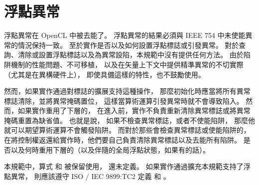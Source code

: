 \section{浮點異常}

浮點異常在 OpenCL 中被去能了。
浮點異常的結果必須與 IEEE 754 中未使能異常的情況保持一致。
至於實作是否以及如何設置浮點標誌或引發異常。
對於查詢、清除或設置浮點標誌以及為異常設陷，本規範中沒有提供任何方法。
由於陷阱機制的性能問題、不可移植，
以及在矢量上下文中提供精準異常的不切實際（尤其是在異構硬件上），
即使具備這樣的特性，也不鼓勵使用。

然而，如果實作通過對標誌的擴展支持這種操作，
那麼初始化時應當將所有異常標誌清除，並將異常掩碼置位，
這樣當算術運算引發異常時就不會導致陷入。
然而，如果實作重用了下層的，
在進入前，實作不負責重新清除異常標誌或將異常掩碼重置為缺省值。
也就是說，
如果不檢查異常標誌，或者不使能陷阱，
那麼他就可以期望算術運算不會觸發陷阱。
而對於那些會檢查異常標誌或使能陷阱的，
在將控制權返還給實作時，他們要自己負責清除異常標誌以及去能所有陷阱。
是否以及何時重用下層的（以及伴隨的全局浮點狀態，如果有的話）。

本規範中，算式  和  被保留使用，
還未定義。
如果實作通過擴充本規範支持了浮點異常，
則應該遵守 ISO / IEC 9899:TC2 定義  和 。
